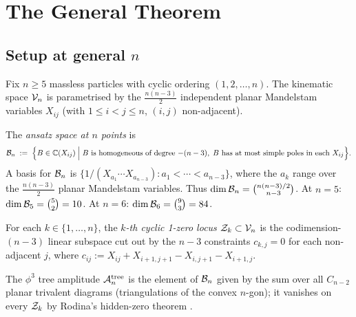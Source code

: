 %

\section{The General Theorem}
\label{sec:general}

\subsection{Setup at general \texorpdfstring{$n$}{n}}
\label{ssec:setup-n}

Fix $n \geq 5$ massless particles with cyclic ordering
$(1, 2, \ldots, n)$.
The kinematic space $\mathcal{V}_n$ is parametrised by
the $\frac{n(n-3)}{2}$ independent planar Mandelstam variables
$X_{ij}$ (with $1 \leq i < j \leq n$, $(i,j)$ non-adjacent).

\begin{definition}
\label{def:ansatz}
The \emph{ansatz space at $n$ points} is
\[
  \mathcal{B}_n \;:=\;
  \Bigl\{
    B \in \mathbb{C}(X_{ij})
    \;\Big|\;
    B \text{ is homogeneous of degree } {-(n-3)},\;
    B \text{ has at most simple poles in each } X_{ij}
  \Bigr\}.
\]
A basis for $\mathcal{B}_n$ is $\{1/(X_{a_1}\cdots X_{a_{n-3}}) :
a_1 < \cdots < a_{n-3}\}$, where the $a_k$ range over the
$\frac{n(n-3)}{2}$ planar Mandelstam variables. Thus
$\dim \mathcal{B}_n = \binom{n(n-3)/2}{n-3}$.
At $n=5$: $\dim \mathcal{B}_5 = \binom{5}{2} = 10$.
At $n=6$: $\dim \mathcal{B}_6 = \binom{9}{3} = 84$.
\end{definition}

\begin{definition}
\label{def:1zero}
For each $k \in \{1, \ldots, n\}$, the \emph{$k$-th cyclic
1-zero locus} $\mathcal{Z}_k \subset \mathcal{V}_n$ is the codimension-$(n-3)$
linear subspace cut out by the $n-3$ constraints
$c_{k,j} = 0$ for each non-adjacent $j$, where
$c_{ij} := X_{ij} + X_{i+1,j+1} - X_{i,j+1} - X_{i+1,j}$.
\end{definition}

The $\phi^3$ tree amplitude $\mathcal{A}_n^{\mathrm{tree}}$ is the
element of $\mathcal{B}_n$ given by the sum over all $C_{n-2}$ planar
trivalent diagrams (triangulations of the convex $n$-gon);
it vanishes on every $\mathcal{Z}_k$ by Rodina's hidden-zero theorem
\cite{Rodina2024}.

